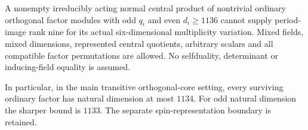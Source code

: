 \begin{theorem}[D-OL-18]
A nonempty irreducibly acting normal central product of nontrivial
ordinary orthogonal factor modules with odd $q_i$ and even
$d_i\ge1136$ cannot supply period-image rank nine for its
actual six-dimensional multiplicity variation.  Mixed fields,
mixed dimensions, represented central quotients, arbitrary
scalars and all compatible factor permutations are allowed.
No selfduality, determinant or inducing-field equality is
assumed.

In particular, in the main transitive orthogonal-core setting,
every surviving ordinary factor has natural dimension at most
$1134$.  For odd natural dimension the sharper bound is
$1133$.  The separate spin-representation boundary is retained.
\end{theorem}

